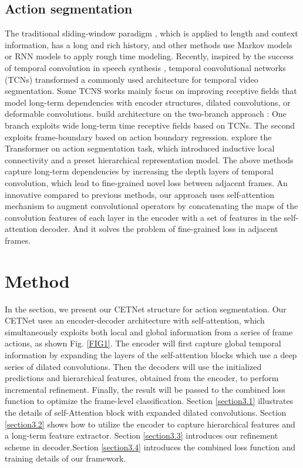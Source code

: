 \documentclass[runningheads]{llncs}
\begin{document}
\subsection{Action segmentation}
\par{
	The traditional sliding-window paradigm \cite{karaman2014fast,rohrbach2012database}, which is applied to length and context information, has a long and rich history, and other methods use Markov \cite{kuehne2016end} models or RNN \cite{yue2015beyond} models to apply rough time modeling. Recently, inspired by the success of temporal convolution in speech synthesis \cite{van2016wavenet} , temporal convolutional networks (TCNs) transformed a commonly used architecture for temporal video segmentation. Some TCNS works \cite{lea2017temporal,lei2018temporal,farha2019ms} mainly focus on improving receptive fields that model long-term dependencies with encoder structures, dilated convolutions, or deformable convolutions. \cite{ishikawa2021alleviating,li2021efficient} build architecture on the two-branch approach : One branch exploits wide long-term time receptive fields based on TCNs. The second exploits frame-boundary based on action boundary regression. \cite{yi2021asformer} explore the Transformer on action segmentation task, which introduced inductive local connectivity and a preset hierarchical representation model. The above methods capture long-term dependencies by increasing the depth layers of temporal convolution, which lead to fine-grained novel loss between adjacent frames. An innovative compared to previous methods, our approach uses self-attention mechanism to augment convolutional operators by concatenating the maps of the convolution features of each layer in the encoder with a set of features in the self-attention decoder. And it solves the problem of fine-grained loss in adjacent frames.
}
\section{Method}
\par{
	In the section, we present our CETNet structure for action segmentation. Our CETNet uses an encoder-decoder architecture with self-attention, which simultaneously exploits both local and global information from a series of frame actions, as shown Fig. \ref{FIG1}. The encoder will first capture global temporal information by expanding the layers of the self-attention blocks which use a deep series of dilated convolutions. Then the decoders will use the initialized predictions and hierarchical features, obtained from the encoder, to perform incremental refinement. Finally, the result will be passed to the combined loss function to optimize the frame-level classification. Section \ref{section3.1} illustrates the details of self-Attention block with expanded dilated convolutions. Section \ref{section3.2} shows how to utilize the encoder to capture hierarchical features and a long-term feature extractor. Section \ref{section3.3} introduces our refinement scheme in decoder.Section \ref{section3.4} introduces the combined loss function and training details of our framework.
}
\end{document}
